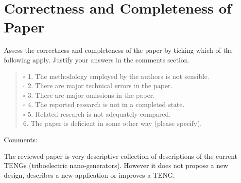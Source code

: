 \documentclass{article}
\begin{document}
\section{Correctness and Completeness of Paper}
{\small Assess the correctness and completeness of the paper by
ticking which of the following apply. Justify your answers in
the comments section.}
\begin{verse}



$\square$
1. The methodology employed by the authors is not sensible.  \\
$\square$
2. There are major technical errors in the paper.  \\
$\square$
3. There are major omissions in the paper.  \\
$\square$
4. The reported research is not in a completed state.  \\
$\square$
5. Related research is not adequately compared.  \\
\makebox[0pt][l]{$\square$}\raisebox{.15ex}{\hspace{0.1em}$\checkmark$}
6. The paper is deficient in some other way (please specify).  \\
\end{verse}
Comments:
\begin{mdframed}
The reviewed paper is very descriptive collection of descriptions of the current TENGs (triboelectric nano-generators). However it does not propose a new design, describes a new application or improves a TENG. 
\end{mdframed}
\end{document}
